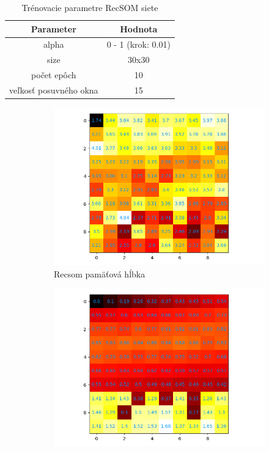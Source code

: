 \begin{table}[h!]
    \centering
    \begin{tabular}{|c|c|} 
     \hline
     Parameter & Hodnota \\ 
     \hline\hline
     alpha & 0 - 1  (krok: 0.01) \\ 
     \hline
     size & 30x30  \\
     \hline
     počet epôch & 10  \\
     \hline
     veľkosť posuvného okna & 15  \\
     \hline
    \end{tabular}
    \caption{Trénovacie parametre RecSOM siete}
    \label{table:1}
    \end{table}

\begin{figure}[H]
    \centering
    \begin{subfigure}{.5\textwidth}
        \centering
        \includegraphics[width=\linewidth]{assets/recsom_memory_span}
        \caption{Recsom pamäťová hĺbka}
        \label{fig:sub1}
    \end{subfigure}%
    \begin{subfigure}{.5\textwidth}
        \centering
        \includegraphics[width=\linewidth]{assets/recsom_quantization_errors}

\end{subfigure}
\end{figure}
